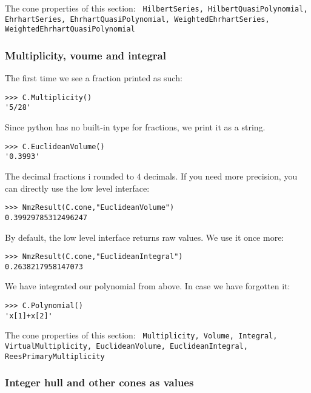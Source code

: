 \documentclass[12pt,a4paper]{scrartcl}
\theoremstyle{definition}
\def\ttt{\texttt}
\begin{document}
\begin{small}
The cone properties of this section: \ttt{    HilbertSeries,
	HilbertQuasiPolynomial,
	EhrhartSeries,
	EhrhartQuasiPolynomial,
	WeightedEhrhartSeries,
	WeightedEhrhartQuasiPolynomial}

\subsubsection{Multiplicity, voume and integral}
The first time we see a fraction printed as such:
\begin{Verbatim}
>>> C.Multiplicity()
'5/28'
\end{Verbatim}
Since python has no built-in type for fractions, we print it as a string.

\begin{Verbatim}
>>> C.EuclideanVolume()
'0.3993'
\end{Verbatim}
The decimal fractions i rounded to $4$ decimals. If you need more precision, you can  directly use the low level interface:
\begin{Verbatim}
>>> NmzResult(C.cone,"EuclideanVolume")
0.39929785312496247
\end{Verbatim}
By default, the low level interface returns raw values. We use it once more:
\begin{Verbatim}
>>> NmzResult(C.cone,"EuclideanIntegral")
0.2638217958147073
\end{Verbatim}
We have integrated our polynomial from above. In case we have forgotten it:
\begin{Verbatim}
>>> C.Polynomial()
'x[1]+x[2]'
\end{Verbatim}

The cone properties of this section: \ttt{    Multiplicity,
	Volume,
	Integral,
	VirtualMultiplicity,
	EuclideanVolume,
	EuclideanIntegral,
	ReesPrimaryMultiplicity
}

\subsubsection{Integer hull and other cones as values}


\end{small}
\end{document}
